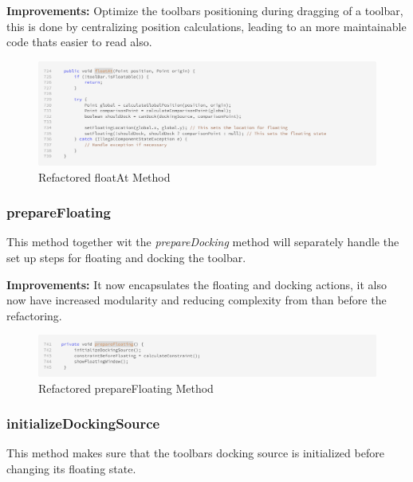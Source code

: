 \textbf{Improvements:} Optimize the toolbars positioning during dragging of a toolbar, this is done by centralizing position calculations, leading to an more maintainable code
thats easier to read also.

\begin{figure}[H]
    \centering
    \includegraphics[width=\linewidth]{pic/F floatAt.png}
    \caption{Refactored floatAt Method}
    \label{fig:Refactored floatAt Method}
\end{figure}







\subsubsection{prepareFloating}
This method together wit the \textit{prepareDocking} method will separately handle the set up steps for floating and docking the toolbar.

\textbf{Improvements:} It now encapsulates the floating and docking actions, it also now have increased modularity and reducing complexity from than before the refactoring.

\begin{figure}[H]
    \centering
    \includegraphics[width=\linewidth]{pic/F prepareFloating.png}
    \caption{Refactored prepareFloating Method}
    \label{fig:Refactored prepareFloating Method}
\end{figure}







\subsubsection{initializeDockingSource}
This method makes sure that the toolbars docking source is initialized before changing its floating state.

